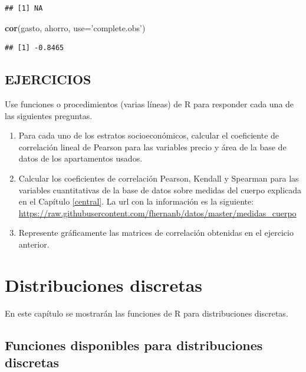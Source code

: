 \documentclass[10pt,]{krantz}
\makeatletter
\newenvironment{Shaded}{\begin{snugshade}}{\end{snugshade}}
\newcommand{\KeywordTok}[1]{\textcolor[rgb]{0.13,0.29,0.53}{\textbf{{#1}}}}
\newcommand{\DataTypeTok}[1]{\textcolor[rgb]{0.13,0.29,0.53}{{#1}}}
\newcommand{\StringTok}[1]{\textcolor[rgb]{0.31,0.60,0.02}{{#1}}}
\newcommand{\NormalTok}[1]{{#1}}
\let\proglang=\textsf
\newenvironment{kframe}{%
\medskip{}
\setlength{\fboxsep}{.8em}
 \def\at@end@of@kframe{}%
 \ifinner\ifhmode%
  \def\at@end@of@kframe{\end{minipage}}%
  \begin{minipage}{\columnwidth}%
 \fi\fi%
 \def\FrameCommand##1{\hskip\@totalleftmargin \hskip-\fboxsep
 \colorbox{shadecolor}{##1}\hskip-\fboxsep
     \hskip-\linewidth \hskip-\@totalleftmargin \hskip\columnwidth}%
 \MakeFramed {\advance\hsize-\width
   \@totalleftmargin\z@ \linewidth\hsize
   \@setminipage}}%
 {\par\unskip\endMakeFramed%
 \at@end@of@kframe}
\renewenvironment{Shaded}{\begin{kframe}}{\end{kframe}}
\makeatother
\begin{document}
\begin{verbatim}
## [1] NA
\end{verbatim}

\begin{Shaded}
\begin{Highlighting}[]
\KeywordTok{cor}\NormalTok{(gasto, ahorro, }\DataTypeTok{use=}\StringTok{'complete.obs'}\NormalTok{)}
\end{Highlighting}
\end{Shaded}

\begin{verbatim}
## [1] -0.8465
\end{verbatim}

\section*{EJERCICIOS}\label{ejercicios-5}


Use funciones o procedimientos (varias líneas) de \proglang{R} para
responder cada una de las siguientes preguntas.

\begin{enumerate}
\def\labelenumi{\arabic{enumi}.}
\item
  Para cada uno de los estratos socioeconómicos, calcular el coeficiente
  de correlación lineal de Pearson para las variables precio y área de
  la base de datos de los apartamentos usados.
\item
  Calcular los coeficientes de correlación Pearson, Kendall y Spearman
  para las variables cuantitativas de la base de datos sobre medidas del
  cuerpo explicada en el Capítulo \ref{central}. La url con la
  información es la siguiente:
  \url{https://raw.githubusercontent.com/fhernanb/datos/master/medidas_cuerpo}
\item
  Represente gráficamente las matrices de correlación obtenidas en el
  ejercicio anterior.
\end{enumerate}

\chapter{\texorpdfstring{Distribuciones discretas
\label{discretas}}{Distribuciones discretas }}\label{distribuciones-discretas}

En este capítulo se mostrarán las funciones de \proglang{R} para
distribuciones discretas.

\section{\texorpdfstring{Funciones disponibles para distribuciones
discretas
}{Funciones disponibles para distribuciones discretas }}\label{funciones-disponibles-para-distribuciones-discretas}
\end{document}
